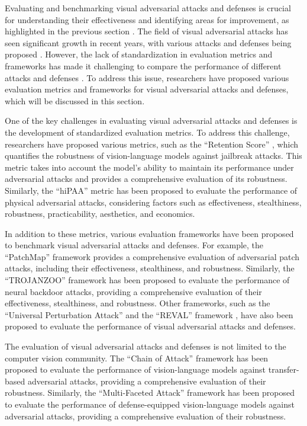 \documentclass[11pt]{article}
\begin{document}
Evaluating and benchmarking visual adversarial attacks and defenses is crucial for understanding their effectiveness and identifying areas for improvement, as highlighted in the previous section \cite{ref8}. The field of visual adversarial attacks has seen significant growth in recent years, with various attacks and defenses being proposed \cite{ref8}. However, the lack of standardization in evaluation metrics and frameworks has made it challenging to compare the performance of different attacks and defenses \cite{ref27}. To address this issue, researchers have proposed various evaluation metrics and frameworks for visual adversarial attacks and defenses, which will be discussed in this section.

One of the key challenges in evaluating visual adversarial attacks and defenses is the development of standardized evaluation metrics. To address this challenge, researchers have proposed various metrics, such as the ``Retention Score'' \cite{ref28}, which quantifies the robustness of vision-language models against jailbreak attacks. This metric takes into account the model's ability to maintain its performance under adversarial attacks and provides a comprehensive evaluation of its robustness. Similarly, the ``hiPAA'' metric \cite{ref3} has been proposed to evaluate the performance of physical adversarial attacks, considering factors such as effectiveness, stealthiness, robustness, practicability, aesthetics, and economics.

In addition to these metrics, various evaluation frameworks have been proposed to benchmark visual adversarial attacks and defenses. For example, the ``PatchMap'' framework \cite{ref29} provides a comprehensive evaluation of adversarial patch attacks, including their effectiveness, stealthiness, and robustness. Similarly, the ``TROJANZOO'' framework \cite{ref30} has been proposed to evaluate the performance of neural backdoor attacks, providing a comprehensive evaluation of their effectiveness, stealthiness, and robustness. Other frameworks, such as the ``Universal Perturbation Attack'' \cite{ref31} and the ``REVAL'' framework \cite{ref32}, have also been proposed to evaluate the performance of visual adversarial attacks and defenses.

The evaluation of visual adversarial attacks and defenses is not limited to the computer vision community. The ``Chain of Attack'' framework \cite{ref33} has been proposed to evaluate the performance of vision-language models against transfer-based adversarial attacks, providing a comprehensive evaluation of their robustness. Similarly, the ``Multi-Faceted Attack'' framework \cite{ref21} has been proposed to evaluate the performance of defense-equipped vision-language models against adversarial attacks, providing a comprehensive evaluation of their robustness.
\end{document}
